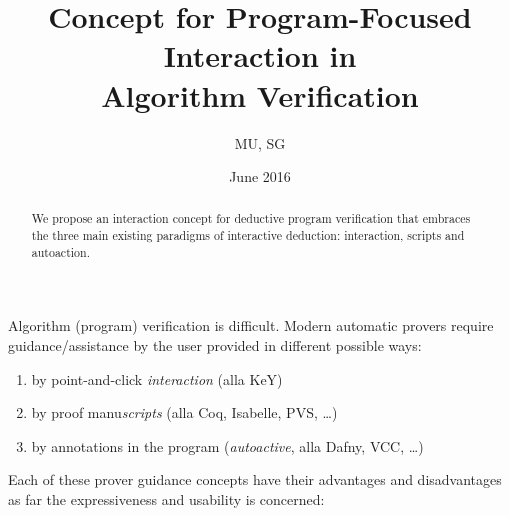 \documentclass{article}
\begin{document}
\title{Concept for Program-Focused Interaction in \\Algorithm Verification}
\author{MU, SG}
\date{June 2016}

\maketitle

\begin{abstract}
  We propose an interaction concept for deductive program verification
  that embraces the three main existing paradigms of interactive
  deduction: interaction, scripts and autoaction.
\end{abstract}

Algorithm (program) verification is difficult. Modern automatic
provers require guidance/assistance by the user provided in different
possible ways:
\begin{enumerate}
\item by point-and-click \emph{interaction} (alla KeY)
\item by proof manu\emph{scripts} (alla Coq, Isabelle, PVS, \dots)
\item by annotations in the program (\emph{autoactive}, alla Dafny, VCC, \ldots)
\end{enumerate}

Each of these prover guidance concepts have their advantages and
disadvantages as far the expressiveness and usability is concerned:
\end{document}

